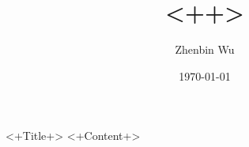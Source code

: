 \documentclass{beamer}
\title{<++>}
\author{Zhenbin Wu}
\institute{Baylor University}
\date{\today}
\begin{document}
\begin{frame}[t,plain]
\titlepage
\end{frame}

\begin{frame}{<+Title+>}
<+Content+>
\end{frame}
\end{document}
